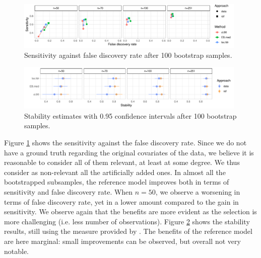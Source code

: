 \documentclass[american,]{article}
\theoremstyle{definition}
\begin{document}
\begin{figure}[tp]
  \centering
  \includegraphics[width=0.98\textwidth]{graphics/bodyfat_sensitivity_vs_fdr.pdf}
  \caption{Sensitivity against false discovery rate after 100 bootstrap samples.\\}
  \label{fig:bodyfat_sensitivity_vs_fdr}
\end{figure}

\begin{figure}[tp]
  \centering
  \includegraphics[width=0.98\textwidth]{graphics/bodyfat_stability.pdf}
  \caption{Stability estimates with 0.95 confidence intervals after 100 bootstrap samples.\\}
  \label{fig:bodyfat_stability}
\end{figure}

Figure \ref{fig:bodyfat_sensitivity_vs_fdr} shows the sensitivity against the false discovery rate. Since we do not have a ground truth regarding the original covariates of the data, we believe it is reasonable to consider all of them relevant, at least at some degree. We thus consider as non-relevant all the artificially added ones. In almost all the bootstrapped subsamples, the reference model improves both in terms of sensitivity and false discovery rate. When $n=50$, we observe a worsening in terms of false discovery rate, yet in a lower amount compared to the gain in sensitivity.  We observe again that the benefits are more evident as the selection is more challenging (i.e. less number of observations). Figure \ref{fig:bodyfat_stability} shows the stability results, still using the measure provided by \cite{paper:stability}. The benefits of the reference model are here marginal: small improvements can be observed, but overall not very notable.

\end{document}
